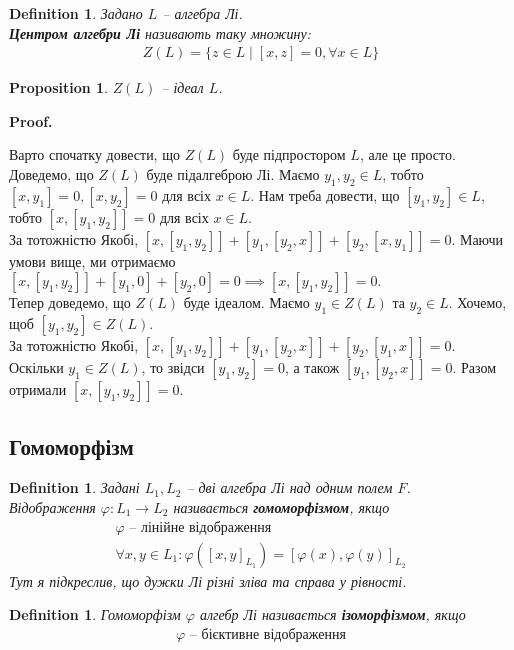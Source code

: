 \documentclass[a4paper, 10pt]{article}
\makeatletter
\theoremstyle{theoremdd}
\newtheorem{definition}[theorem]{Definition}
\newtheorem{proposition}[theorem]{Proposition}
\renewenvironment{proof}[1][Proof.\\]{\par
\pushQED{\hfill \qed}%
\normalfont \topsep6\p@\@plus6\p@\relax
\trivlist
\item\relax
{\bfseries
#1\@addpunct{.}}\hspace\labelsep\ignorespaces
}{%
\popQED\endtrivlist\@endpefalse
}
\makeatother
\begin{document}
\begin{definition}
Задано $L$ -- алгебра Лі.\\
\textbf{Центром алгебри Лі} називають таку множину:
\begin{align*}
Z(L) = \{z \in L \mid [x,z] = 0, \forall x \in L\}
\end{align*}
\end{definition}

\begin{proposition}
$Z(L)$ -- ідеал $L$.
\end{proposition}

\begin{proof}
Варто спочатку довести, що $Z(L)$ буде підпростором $L$, але це просто.\\
Доведемо, що $Z(L)$ буде підалгеброю Лі. Маємо $y_1,y_2 \in L$, тобто $[x,y_1] = 0, [x,y_2] = 0$ для всіх $x \in L$. Нам треба довести, що $[y_1,y_2] \in L$, тобто $[x,[y_1,y_2]] = 0$ для всіх $x \in L$.\\
За тотожністю Якобі, $[x,[y_1,y_2]] + [y_1,[y_2,x]] + [y_2,[x,y_1]] = 0$. Маючи умови вище, ми отримаємо $[x,[y_1,y_2]] + [y_1,0] + [y_2,0] = 0 \implies [x,[y_1,y_2]] = 0$.\\
Тепер доведемо, що $Z(L)$ буде ідеалом. Маємо $y_1 \in Z(L)$ та $y_2 \in L$. Хочемо, щоб $[y_1,y_2] \in Z(L)$.\\
За тотожністю Якобі, $[x,[y_1,y_2]] + [y_1,[y_2,x]] + [y_2,[y_1,x]] = 0$. Оскільки $y_1 \in Z(L)$, то звідси $[y_1,y_2] = 0$, а також $[y_1,[y_2,x]] = 0$. Разом отримали $[x,[y_1,y_2]] = 0$.
\end{proof}

\subsection{Гомоморфізм}
\begin{definition}
Задані $L_1,L_2$ -- дві алгебра Лі над одним полем $F$.\\
Відображення $\varphi \colon L_1 \to L_2$ називається \textbf{гомоморфізмом}, якщо
\begin{align*}
\varphi \text{ -- лінійне відображення} \\
\forall x,y \in L_1: \varphi([x,y]_{L_1}) = [\varphi(x),\varphi(y)]_{L_2}
\end{align*}
Тут я підкреслив, що дужки Лі різні зліва та справа у рівності.
\end{definition}

\begin{definition}
Гомоморфізм $\varphi$ алгебр Лі називається \textbf{ізоморфізмом}, якщо
\begin{align*}
\varphi \text{ -- бієктивне відображення}
\end{align*}
\end{definition}
\end{document}
